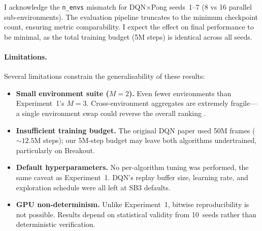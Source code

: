 I acknowledge the \texttt{n\_envs} mismatch for DQN$\times$Pong
seeds~1--7 (8 vs 16 parallel sub-environments). The evaluation
pipeline truncates to the minimum checkpoint count, ensuring metric
comparability. I expect the effect on final performance to be minimal,
as the total training budget (5M steps) is identical across all seeds.

\paragraph{Limitations.}
Several limitations constrain the generalisability of these results:
\begin{itemize}
  \item \textbf{Small environment suite ($M = 2$).} Even fewer
        environments than Experiment~1's $M = 3$. Cross-environment
        aggregates are extremely fragile---a single environment swap
        could reverse the overall ranking
        \citep{agarwal2021precipice, patterson2024edrl}.
  \item \textbf{Insufficient training budget.} The original DQN paper
        \citep{mnih2015human} used 50M frames (${\sim}12.5$M steps);
        our 5M-step budget may leave both algorithms undertrained,
        particularly on Breakout.
  \item \textbf{Default hyperparameters.} No per-algorithm tuning was
        performed, the same caveat as Experiment~1. DQN's replay buffer
        size, learning rate, and exploration schedule were all left at
        SB3 defaults.
  \item \textbf{GPU non-determinism.} Unlike Experiment~1, bitwise
        reproducibility is not possible. Results depend on statistical
        validity from 10~seeds rather than deterministic verification.
\end{itemize}

